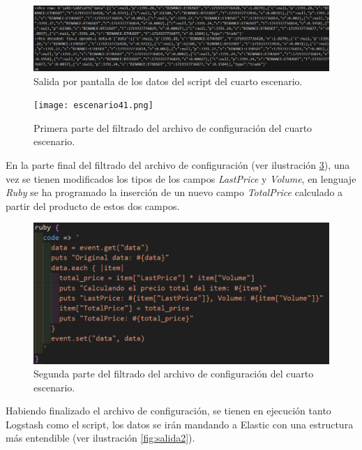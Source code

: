 \begin{figure}
    \centering
    \includegraphics[width=1\linewidth]{img/salida1.png}
    \caption{Salida por pantalla de los datos del script del cuarto escenario.}
    \label{fig:salida1}
\end{figure}


\begin{figure}
    \centering
    \texttt{[image: escenario41.png]}
    \caption{Primera parte del filtrado del archivo de configuración del cuarto escenario.}
    \label{fig:filtrado1}
\end{figure}


En la parte final del filtrado del archivo de configuración  (ver ilustración  \ref{fig:filtrado2}), una vez se tienen modificados los tipos de los campos \textit{LastPrice} y \textit{Volume}, en lenguaje \textit{Ruby} se ha programado la inserción de un nuevo campo \textit{TotalPrice} calculado a partir del producto de estos dos campos.
\begin{figure}
    \centering
    \includegraphics[width=1\linewidth]{img/escenario42.png}
    \caption{Segunda parte del filtrado del archivo de configuración del cuarto escenario.}
    \label{fig:filtrado2}
\end{figure}

Habiendo finalizado el archivo de configuración, se tienen en ejecución tanto Logstash como el script, los datos se irán mandando a Elastic con una estructura más entendible  (ver ilustración  \ref{fig:salida2}).


